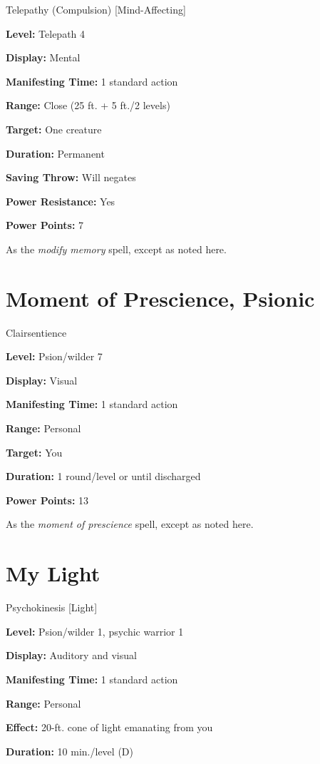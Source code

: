 \documentclass{article}
\begin{document}
Telepathy (Compulsion) [Mind-Affecting]

\textbf{Level:} Telepath 4

\textbf{Display:} Mental

\textbf{Manifesting Time:} 1 standard action

\textbf{Range:} Close (25 ft. + 5 ft./2 levels)

\textbf{Target:} One creature

\textbf{Duration:} Permanent

\textbf{Saving Throw:} Will negates

\textbf{Power Resistance:} Yes

\textbf{Power Points:} 7

As the \textit{modify memory }spell, except as noted here.

\vspace{12pt}
\section*{Moment of Prescience, Psionic}

Clairsentience

\textbf{Level:} Psion/wilder 7

\textbf{Display:} Visual

\textbf{Manifesting Time:} 1 standard action

\textbf{Range:} Personal

\textbf{Target:} You

\textbf{Duration:} 1 round/level or until discharged

\textbf{Power Points:} 13

As the \textit{moment of prescience }spell, except as noted here.

\vspace{12pt}
\section*{My Light}

Psychokinesis [Light]

\textbf{Level:} Psion/wilder 1, psychic warrior 1

\textbf{Display:} Auditory and visual

\textbf{Manifesting Time:} 1 standard action

\textbf{Range:} Personal

\textbf{Effect:} 20-ft. cone of light emanating from you

\textbf{Duration:} 10 min./level (D)
\end{document}
